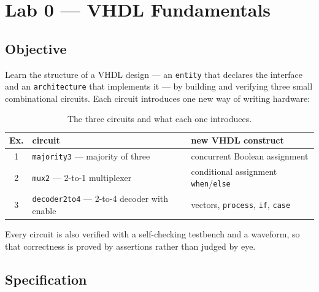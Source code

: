 %

\chapter{Lab 0 --- VHDL Fundamentals}

\section{Objective}

Learn the structure of a VHDL design --- an \texttt{entity} that declares the
interface and an \texttt{architecture} that implements it --- by building and
verifying three small combinational circuits. Each circuit introduces one new way
of writing hardware:

\begin{table}[H]
\centering
\caption{The three circuits and what each one introduces.}
\label{tab:lab00-plan}
\begin{tabular}{cll}
\toprule
Ex. & circuit & new VHDL construct \\
\midrule
1 & \texttt{majority3} --- majority of three & concurrent Boolean assignment \\
2 & \texttt{mux2} --- 2-to-1 multiplexer & conditional assignment \texttt{when}/\texttt{else} \\
3 & \texttt{decoder2to4} --- 2-to-4 decoder with enable & vectors, \texttt{process}, \texttt{if}, \texttt{case} \\
\bottomrule
\end{tabular}
\end{table}

Every circuit is also verified with a self-checking testbench and a waveform, so
that correctness is proved by assertions rather than judged by eye.

\section{Specification}

